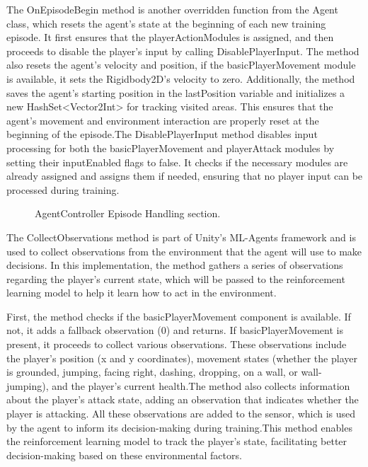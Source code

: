 \documentclass[12pt,oneside,openright,a4paper]{cpe-english-project}
\begin{document}
The OnEpisodeBegin method is another overridden function from the Agent class, which resets the agent’s state at the beginning of each new training episode. It first ensures that the playerActionModules is assigned, and then proceeds to disable the player’s input by calling DisablePlayerInput. The method also resets the agent's velocity and position, if the basicPlayerMovement module is available, it sets the Rigidbody2D's velocity to zero. Additionally, the method saves the agent's starting position in the lastPosition variable and initializes a new HashSet<Vector2Int> for tracking visited areas. This ensures that the agent’s movement and environment interaction are properly reset at the beginning of the episode.The DisablePlayerInput method disables input processing for both the basicPlayerMovement and playerAttack modules by setting their inputEnabled flags to false. It checks if the necessary modules are already assigned and assigns them if needed, ensuring that no player input can be processed during training.\par
 \begin{figure}[!h]
 \centering
\caption{AgentController Episode Handling section.}\label{fig:Epihand}
\end{figure}
\newpage
The CollectObservations method is part of Unity's ML-Agents framework and is used to collect observations from the environment that the agent will use to make decisions. In this implementation, the method gathers a series of observations regarding the player's current state, which will be passed to the reinforcement learning model to help it learn how to act in the environment.\par
First, the method checks if the basicPlayerMovement component is available. If not, it adds a fallback observation (0) and returns. If basicPlayerMovement is present, it proceeds to collect various observations. These observations include the player’s position (x and y coordinates), movement states (whether the player is grounded, jumping, facing right, dashing, dropping, on a wall, or wall-jumping), and the player’s current health.The method also collects information about the player's attack state, adding an observation that indicates whether the player is attacking. All these observations are added to the sensor, which is used by the agent to inform its decision-making during training.This method enables the reinforcement learning model to track the player's state, facilitating better decision-making based on these environmental factors.\par
\end{document}
